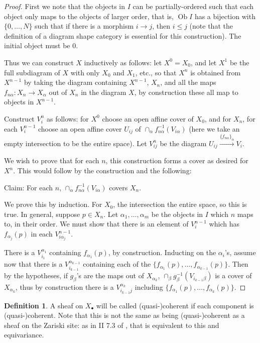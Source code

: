 \documentclass[proquest]{uwthesis}[2014/11/13]
\theoremstyle{definition}
\newtheorem{definition}[theorem]{Definition}
\DeclareMathOperator{\Ob}{Ob}
\begin{document}
\begin{proof}
	First we note that the objects in $I$ can be partially-ordered such that each object only maps to the objects of larger order, that is, $\Ob I$ has a bijection with $\{0, \dots, N\}$ such that if there is a morphism $i \rightarrow j$, then $i \leq j$ (note that the definition of a diagram shape category is essential for this construction).
	The initial object must be 0.
	
	Thus we can construct $X$ inductively as follows: let $X^0 = X_0$, and let $X^1$ be the full subdiagram of $X$ with only $X_0$ and $X_1$, etc., so that $X^n$ is obtained from $X^{n-1}$ by taking the diagram containing $X^{n-1}$, $X_n$, and all the maps $f_{n\alpha}:X_n \rightarrow X_\alpha$ out of $X_n$ in the diagram $X$, by construction these all map to objects in $X^{n-1}$.
	
	Construct $V_i^n$ as follows: for $X^0$ choose an open affine cover of $X_0$, and for $X_n$, for each $V_i^{n-1}$ choose an open affine cover $U_{ij}$ of $\cap_\alpha f_{n\alpha}^{-1}(V_{i\alpha})$ (here we take an empty intersection to be the entire space).
	Let $V_{ij}^n$ be the diagram $U_{ij} \xrightarrow{\{f_{n\alpha}\}_\alpha} V_i$.
	
	We wish to prove that for each $n$, this construction forms a cover as desired for $X^n$.
	This would follow by the construction and the following:
	
	Claim: For each $n$, $\cap_\alpha f_{n\alpha}^{-1}(V_{i\alpha})$ covers $X_n$.
	
	We prove this by induction.
	For $X_0$, the intersection the entire space, so this is true.
	In general, suppose $p \in X_n$.
	Let $\alpha_1, \dots, \alpha_m$ be the objects in $I$ which $n$ maps to, in their order.
	We must show that there is an element of $V_i^{n-1}$ which has $f_{\alpha_j}(p)$ in each $V_{i \alpha_j}^{n-1}$.
	
	There is a $V_{i_1}^{\alpha_1}$ containing $f_{\alpha_1}(p)$, by construction.
	Inducting on the $\alpha_i$'s, assume now that there is a $V_{i_{k-1}}^{\alpha_{k-1}}$ containing each of the $\{f_{\alpha_1}(p), \dots, f_{\alpha_{k-1}}(p)\}$.
	Then by the hypotheses, if $g_\beta$'s are the maps out of $X_{\alpha_k}$, $\cap_\beta g_{\beta}^{-1}(V_{i_{k-1}\beta})$ is a cover of $X_{\alpha_k}$, thus by construction there is a $V_{i_{k-1}j}^{\alpha_k}$ including $\{f_{\alpha_1}(p), \dots, f_{\alpha_{k}}(p)\}$.
\end{proof}

\begin{definition}
	A sheaf on $X_\bullet$ will be called (quasi-)coherent if each component is (quasi-)coherent.
	Note that this is not the same as being (quasi-)coherent as a sheaf on the Zariski site:
	as in II 7.3 of \cite{Lipman2009}, that is equivalent to this and equivariance.
\end{definition}
\end{document}
